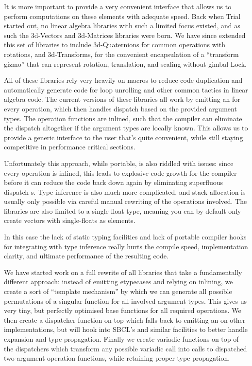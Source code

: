 \documentclass[format=sigconf]{acmart}
\begin{document}
It is more important to provide a very convenient interface that allows us to perform computations on these elements with adequate speed. Back when Trial started out, no linear algebra libraries with such a limited focus existed, and as such the 3d-Vectors and 3d-Matrices libraries were born. We have since extended this set of libraries to include 3d-Quaternions for common operations with rotations, and 3d-Transforms, for the convenient encapsulation of a ``transform gizmo'' that can represent rotation, translation, and scaling without gimbal Lock.

All of these libraries rely very heavily on macros to reduce code duplication and automatically generate code for loop unrolling and other common tactics in linear algebra code. The current versions of these libraries all work by emitting an  for every operation, which then handles dispatch based on the provided argument types. The operation functions are inlined, such that the compiler can eliminate the dispatch altogether if the argument types are locally known. This allows us to provide a generic interface to the user that's quite convenient, while still staying competitive in performance critical sections.

Unfortunately this approach, while portable, is also riddled with issues: since every operation is inlined, this leads to explosive code growth for the compiler before it can reduce the code back down again by eliminating superfluous dispatch s. Type inference is also much more complicated, and stack allocation is usually only possible via careful manual rewriting of the operations involved. The libraries are also limited to a single float type, meaning you can by default only create vectors with single-floats as elements.

In this case the lack of static typing facilities and lack of portable compiler hooks for integrating with type inference really hurts the compile speed, implementation clarity, and ultimate performance of the resulting code.

We have started work on a full rewrite of all libraries that take a fundamentally different approach: instead of emitting etypecases and relying on inlining, we create a sort of ``template mechanism'' by which we can generate all possible permutations of a singular function for all involved argument types. This gives us very tiny, but perfectly optimised base functions for all required operations. We then create a dispatcher function on top which falls back to emitting an  on other implementations, but will hook into SBCL's  and similar facilities to better handle expansion and type propagation. Finally we create variadic functions on top of the dispatchers which transform any possible variadic call into calls to dispatched two-argument operation functions, while retaining proper type propagation.
\end{document}
